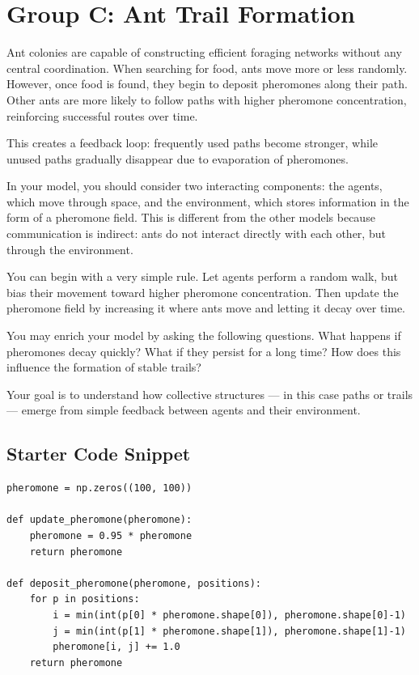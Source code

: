 \documentclass[paper=letter, fontsize=12pt]{article}
\numberwithin{equation}{section}
\begin{document}
\section*{Group C: Ant Trail Formation}

Ant colonies are capable of constructing efficient foraging networks without any central coordination. When searching for food, ants move more or less randomly. However, once food is found, they begin to deposit pheromones along their path. Other ants are more likely to follow paths with higher pheromone concentration, reinforcing successful routes over time.

This creates a feedback loop: frequently used paths become stronger, while unused paths gradually disappear due to evaporation of pheromones.

In your model, you should consider two interacting components: the agents, which move through space, and the environment, which stores information in the form of a pheromone field. This is different from the other models because communication is indirect: ants do not interact directly with each other, but through the environment.

You can begin with a very simple rule. Let agents perform a random walk, but bias their movement toward higher pheromone concentration. Then update the pheromone field by increasing it where ants move and letting it decay over time.

You may enrich your model by asking the following questions. What happens if pheromones decay quickly? What if they persist for a long time? How does this influence the formation of stable trails?

Your goal is to understand how collective structures --- in this case paths or trails --- emerge from simple feedback between agents and their environment.

\subsection*{Starter Code Snippet}

\begin{lstlisting}
pheromone = np.zeros((100, 100))

def update_pheromone(pheromone):
    pheromone = 0.95 * pheromone
    return pheromone

def deposit_pheromone(pheromone, positions):
    for p in positions:
        i = min(int(p[0] * pheromone.shape[0]), pheromone.shape[0]-1)
        j = min(int(p[1] * pheromone.shape[1]), pheromone.shape[1]-1)
        pheromone[i, j] += 1.0
    return pheromone
\end{lstlisting}
\end{document}
